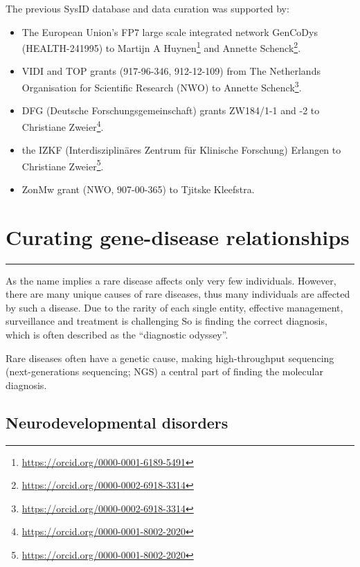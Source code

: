 \documentclass[
]{article}
\providecommand{\tightlist}{%
  \setlength{\itemsep}{0pt}\setlength{\parskip}{0pt}}
\renewcommand{\href}[2]{#2\footnote{\url{#1}}}
\begin{document}
The previous SysID database and data curation was supported by:

\begin{itemize}
\tightlist
\item
  The European Union's FP7 large scale integrated network GenCoDys (HEALTH-241995) to \href{https://orcid.org/0000-0001-6189-5491}{Martijn A Huynen} and \href{https://orcid.org/0000-0002-6918-3314}{Annette Schenck}.
\item
  VIDI and TOP grants (917-96-346, 912-12-109) from The Netherlands Organisation for Scientific Research (NWO) to \href{https://orcid.org/0000-0002-6918-3314}{Annette Schenck}.
\item
  DFG (Deutsche Forschungsgemeinschaft) grants ZW184/1-1 and -2 to \href{https://orcid.org/0000-0001-8002-2020}{Christiane Zweier}.
\item
  the IZKF (Interdisziplinäres Zentrum für Klinische Forschung) Erlangen to \href{https://orcid.org/0000-0001-8002-2020}{Christiane Zweier}.
\item
  ZonMw grant (NWO, 907-00-365) to Tjitske Kleefstra.
\end{itemize}

\hypertarget{curating-gene-disease-relationships}{%
\section{Curating gene-disease relationships}\label{curating-gene-disease-relationships}}

\begin{center}\rule{0.5\linewidth}{0.5pt}\end{center}

As the name implies a rare disease affects only very few individuals. However, there are many unique causes of rare diseases, thus many individuals are affected by such a disease.
Due to the rarity of each single entity, effective management, surveillance and treatment is challenging So is finding the correct diagnosis, which is often described as the ``diagnostic odyssey''.

Rare diseases often have a genetic cause, making high-throughput sequencing (next-generations sequencing; NGS) a central part of finding the molecular diagnosis.

\hypertarget{neurodevelopmental-disorders}{%
\subsection{Neurodevelopmental disorders}\label{neurodevelopmental-disorders}}
\end{document}
